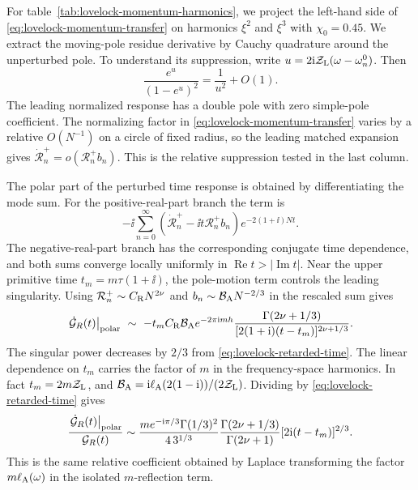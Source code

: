For table~\ref{tab:lovelock-momentum-harmonics}, we project
the left-hand side of \eqref{eq:lovelock-momentum-transfer}
on harmonics \(\xi^2\) and \(\xi^3\) with \(\chi_0=0.45\).
We extract the moving-pole residue derivative by Cauchy
quadrature around the unperturbed pole. To understand its
suppression, write \(u=2\mathrm{i}\mathcal Z_{\rm L}(\omega-\omega_n^0)\).
Then
\begin{equation}
 \frac{e^u}{(1-e^u)^2}=\frac{1}{u^2}+O(1).
\end{equation}
The leading normalized response has a double pole with
zero simple-pole coefficient. The normalizing factor in
\eqref{eq:lovelock-momentum-transfer} varies by a relative
\(O(N^{-1})\) on a circle of fixed radius, so the leading
matched expansion gives
\(\dot{\mathcal R}_n^+=o(\mathcal R_n^+ b_n)\).
This is the relative suppression tested in the last column.

The polar part of the perturbed time response is obtained
by differentiating the mode sum. For the positive-real-part
branch the term is
\begin{equation}
 -\ii\sum_{n=0}^\infty
   (\dot{\mathcal R}_n^+-\ii t\mathcal R_n^+ b_n)
     e^{-2(1+\ii)Nt}.
 \label{eq:lovelock-time-momentum-polar}
\end{equation}
The negative-real-part branch has the corresponding conjugate
time dependence, and both sums converge locally uniformly
in \(\operatorname{Re}t>|\operatorname{Im}t|\).
Near the upper primitive time \(t_m=m\tau(1+\ii)\),
the pole-motion term controls the leading singularity.
Using \(\mathcal R_n^+\sim C_{\rm R}N^{2\nu}\) and
\(b_n\sim\mathcal B_{\rm A}N^{-2/3}\) in the rescaled sum gives
\begin{equation}
 \left.\dot{\mathcal G}_R(t)\right|_{\rm polar}
 \ \sim\
 -t_m C_{\rm R}\mathcal B_{\rm A} e^{-2\pi\mathrm{i} m h}
 \frac{\Gamma(2\nu+1/3)}
      {[2(1+\mathrm{i})(t-t_m)]^{2\nu+1/3}} .
 \label{eq:lovelock-momentum-time-power}
\end{equation}
The singular power decreases by \(2/3\) from
\eqref{eq:lovelock-retarded-time}. The linear dependence
on \(t_m\) carries the factor of \(m\) in the
frequency-space harmonics. In fact \(t_m=2m\mathcal Z_{\rm L}\),
and \(\mathcal B_{\rm A}=\mathrm{i}\ell_{\rm A}(2(1-\mathrm{i}))/(2\mathcal Z_{\rm L})\).
Dividing by \eqref{eq:lovelock-retarded-time} gives
\begin{equation}
 \frac{\left.\dot{\mathcal G}_R(t)\right|_{\rm polar}}
      {\mathcal G_R(t)}
 \sim
 \frac{m e^{-\mathrm{i}\pi/3}\Gamma(1/3)^2}{4\,3^{1/3}}
 \frac{\Gamma(2\nu+1/3)}{\Gamma(2\nu+1)}
 [2\mathrm{i}(t-t_m)]^{2/3}.
 \label{eq:lovelock-momentum-time-ratio}
\end{equation}
This is the same relative coefficient obtained by Laplace
transforming the factor \(m\ell_{\rm A}(\omega)\) in the
isolated \(m\)-reflection term.


